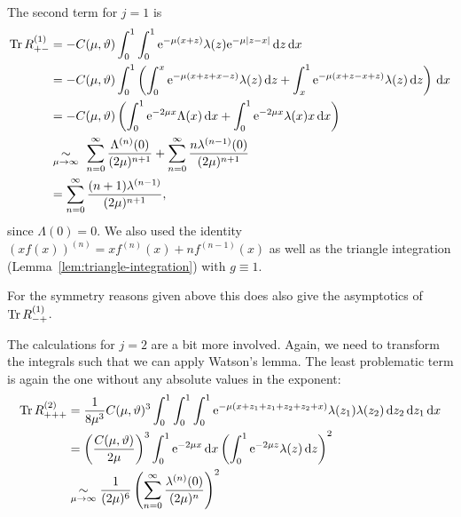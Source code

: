 The second term for $j=1$ is
\begin{align*}
    \Tr R^{(1)}_{+-} &= -C(\mu,\theta)
        \Integ[1]{0}{x}{
            \Integ[1]{0}{z}{\Eto{-\mu(x+z)}
                \lambda(z)\Eto{-\mu\left|z-x\right|}
            }
        } \\
        &= -C(\mu,\theta)
            \Integ[1]{0}{x}{\left(
                \Integ[x]{0}{z}{
                    \Eto{-\mu(x+z+x-z)} \lambda(z)
                }
                +
                \Integ[1]{x}{z}{
                    \Eto{-\mu(x+z-x+z)} \lambda(z)
                }
                \right)
            } \\
        &= -C(\mu,\theta) \left(
            \Integ[1]{0}{x}{\Eto{-2\mu x} \Lambda(x)}
            + \Integ[1]{0}{x}{\Eto{-2\mu x}\lambda(x)x}
            \right) \\
        &\SimAs{\mu\to\infty}\ 
            \sum_{n=0}^\infty \frac{\Lambda^{(n)}(0)}{(2\mu)^{n+1}}
            + \sum_{n=0}^\infty \frac{n\lambda^{(n-1)}(0)}{(2\mu)^{n+1}} \\
        &= \sum_{n=0}^\infty \frac{(n+1)\lambda^{(n-1)}}{(2\mu)^{n+1}},
\end{align*}
since $\Lambda(0) = 0$. We also used the identity $(xf(x))^{(n)} = xf^{(n)}(x) +
nf^{(n-1)}(x)$ as well as the triangle integration
(Lemma~\ref{lem:triangle-integration}) with $g \equiv 1$.

For the symmetry reasons given above this does also give the asymptotics of $\Tr
R^{(1)}_{-+}$.

The calculations for $j = 2$ are a bit more involved. Again, we need to
transform the integrals such that we can apply Watson's lemma. The least
problematic term is again the one without any absolute values in the exponent:
\begin{align*}
    \Tr R^{(2)}_{+++} &= \frac{1}{8\mu^3} C(\mu,\theta)^3
    \Integ[1]{0}{x}{
        \Integ[1]{0}{z_1}{
            \Integ[1]{0}{z_2}{
                \Eto{-\mu(x + z_1 + z_1 + z_2 + z_2 + x)}
                \lambda(z_1)\lambda(z_2)
                }
            }
        } \\
    &= \left(\frac{C(\mu,\theta)}{2\mu}\right)^3
            \Integ[1]{0}{x}{\Eto{-2\mu x}}
           \left(
               \Integ[1]{0}{z}{\Eto{-2\mu z}\lambda(z)}
            \right)^2 \\
    &\SimAs{\mu\to\infty}
    \frac{1}{(2\mu)^6}
        \left( \sum_{n=0}^{\infty}\frac{\lambda^{(n)}(0)}{(2\mu)^n} \right)^2
\end{align*}

